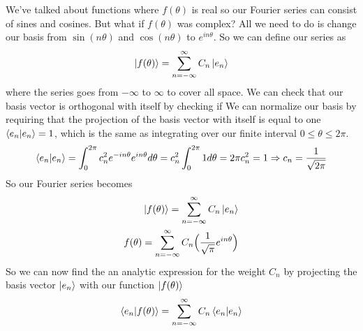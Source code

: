 \documentclass{article}
\newcommand{\be}{\begin{equation}}
\newcommand{\ee}{\end{equation}}
\begin{document}
We've talked about functions where $f(\theta)$ is real so our Fourier series can consist of sines and cosines.
But what if $f(\theta)$ was complex?
All we need to do is change our basis from $\sin(n \theta)$ and $\cos(n \theta)$ to $e^{i n \theta}$.
So we can define our series as
\be
  \ket{f(\theta)} = \sum_{n= - \infty}^{\infty} C_n \ket{e_n}
\ee
where the series goes from $- \infty$ to $\infty$ to cover all space.
We can check that our basis vector is orthogonal with itself by checking if
We can normalize our basis by requiring that the projection of the basis vector with itself is equal to one $\braket{e_n|e_n} = 1$, which is the same as integrating over our finite interval $0 \leq \theta \leq 2 \pi$.
\be
  \braket{e_n | e_n} = \int_{0}^{2 \pi} c_n^2 e^{-i n \theta} e^{i n \theta} d \theta = c_n^2 \int_{0}^{2 \pi} 1 d \theta = 2 \pi c_n^2 = 1 \Rightarrow c_n = \frac{1}{\sqrt{2 \pi}}
\ee
So our Fourier series becomes
\be
  \begin{split}
    \ket{f(\theta)} = \sum_{n= - \infty}^{\infty} C_n \ket{e_n} \\
    f(\theta) = \sum_{n= - \infty}^{\infty} C_n \Big( \frac{1}{\sqrt{\pi}} e^{i n \theta} \Big)
  \end{split}
\ee
So we can now find the an analytic expression for the weight $C_n$ by projecting the basis vector $\ket{e_n}$ with our function $\ket{f(\theta)}$
\be
  \braket{e_n|f(\theta)} = \sum_{n= - \infty}^{\infty} C_n \braket{e_n|e_n}
\ee
\end{document}

